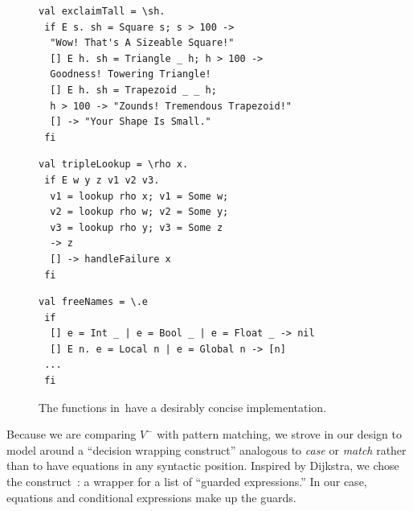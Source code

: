 \documentclass[runningheads]{llncs}
\begin{document}
\begin{figure}[t]
\scriptsize
\begin{minipage}[t]{0.48\linewidth}
\begin{verbatim}
val exclaimTall = \sh.
 if E s. sh = Square s; s > 100 ->
  "Wow! That's A Sizeable Square!"
  [] E h. sh = Triangle _ h; h > 100 ->
  Goodness! Towering Triangle!
  [] E h. sh = Trapezoid _ _ h;
  h > 100 -> "Zounds! Tremendous Trapezoid!"
  [] -> "Your Shape Is Small."
 fi
\end{verbatim}
\label{fig:vmexclaimtall}
\end{minipage}\hfill
\begin{minipage}[t]{0.48\linewidth}
\begin{verbatim}
val tripleLookup = \rho x.
 if E w y z v1 v2 v3.
  v1 = lookup rho x; v1 = Some w;
  v2 = lookup rho w; v2 = Some y;
  v3 = lookup rho y; v3 = Some z
  -> z
  [] -> handleFailure x
 fi
\end{verbatim}
\label{fig:vmtriplelookup}
\end{minipage}

\medskip

\begin{minipage}[t]{\linewidth}
\begin{verbatim}
val freeNames = \.e
 if
  [] e = Int _ | e = Bool _ | e = Float _ -> nil
  [] E n. e = Local n | e = Global n -> [n]
 ...
 fi
\end{verbatim}
\label{fig:vmgot}
\end{minipage}

\caption{The functions in~\VMinus have a desirably concise implementation.}
\label{fig:vminusfuncs}
\end{figure}


Because we are comparing $V^-$ with pattern matching, we strove in our
    design to model around a ``decision wrapping construct'' analogous to
    \textit{case} or \textit{match} rather than to have equations in any
    syntactic position. %
    Inspired by Dijkstra, we chose the \iffibf construct~\cite{dijkstra}: a
    wrapper for a list of ``guarded expressions.'' %
    In our case, equations and conditional expressions make up the guards. %
    
    
\end{document}
